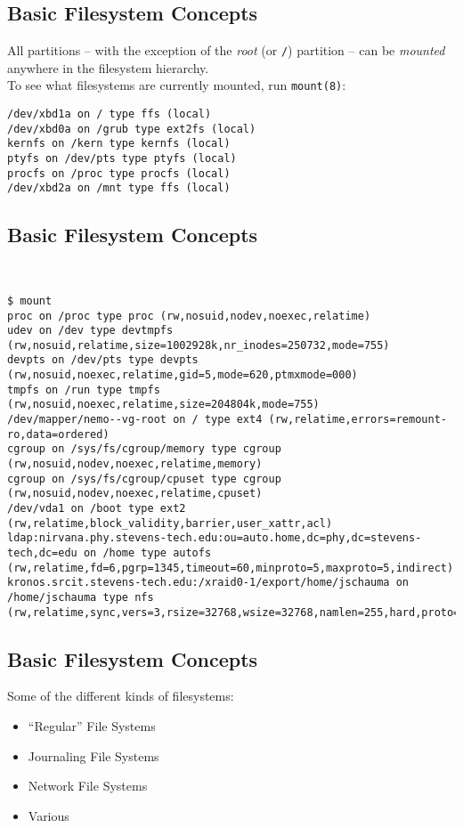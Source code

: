 \documentclass[xga]{xdvislides}
\begin{document}
\subsection{Basic Filesystem Concepts}
All partitions -- with the exception of the {\em root} (or \verb+/+) partition
-- can be {\em mounted} anywhere in the filesystem hierarchy.
\\

To see what filesystems are currently mounted, run \verb+mount(8)+:
\\

\begin{verbatim}
/dev/xbd1a on / type ffs (local)
/dev/xbd0a on /grub type ext2fs (local)
kernfs on /kern type kernfs (local)
ptyfs on /dev/pts type ptyfs (local)
procfs on /proc type procfs (local)
/dev/xbd2a on /mnt type ffs (local)
\end{verbatim}


\subsection{Basic Filesystem Concepts}
\\

\begin{verbatim}
$ mount
proc on /proc type proc (rw,nosuid,nodev,noexec,relatime)
udev on /dev type devtmpfs (rw,nosuid,relatime,size=1002928k,nr_inodes=250732,mode=755)
devpts on /dev/pts type devpts (rw,nosuid,noexec,relatime,gid=5,mode=620,ptmxmode=000)
tmpfs on /run type tmpfs (rw,nosuid,noexec,relatime,size=204804k,mode=755)
/dev/mapper/nemo--vg-root on / type ext4 (rw,relatime,errors=remount-ro,data=ordered)
cgroup on /sys/fs/cgroup/memory type cgroup (rw,nosuid,nodev,noexec,relatime,memory)
cgroup on /sys/fs/cgroup/cpuset type cgroup (rw,nosuid,nodev,noexec,relatime,cpuset)
/dev/vda1 on /boot type ext2 (rw,relatime,block_validity,barrier,user_xattr,acl)
ldap:nirvana.phy.stevens-tech.edu:ou=auto.home,dc=phy,dc=stevens-tech,dc=edu on /home type autofs (rw,relatime,fd=6,pgrp=1345,timeout=60,minproto=5,maxproto=5,indirect)
kronos.srcit.stevens-tech.edu:/xraid0-1/export/home/jschauma on /home/jschauma type nfs (rw,relatime,sync,vers=3,rsize=32768,wsize=32768,namlen=255,hard,proto=tcp,timeo=600,retrans=2,sec=sys,mountaddr=155.246.89.203,mountvers=3,mountport=53643,mountproto=udp,local_lock=none,addr=155.246.89.203)
\end{verbatim}

\subsection{Basic Filesystem Concepts}
Some of the different kinds of filesystems:
\begin{itemize}
	\item ``Regular'' File Systems
	\item Journaling File Systems
	\item Network File Systems
	\item Various
\end{itemize}
\end{document}
